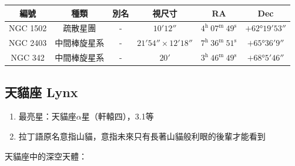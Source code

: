 \begin{center}
\begin{longtable}{c | c | c | c | c | c}
    編號 & 種類 & 別名 & 視尺寸 & RA & Dec \\
    \hline
    \endfirsthead


    \endfoot

    \endlastfoot

    NGC 1502 & 疏散星團 & - & \(\ang{;10;12}\) & \(4^\text{h }07^\text{m }49^\text{s}\) & \(+\ang{62;19;53}\) \\
    NGC 2403 & 中間棒旋星系 & - & \(\ang{;21;54}\times\ang{;12;18}\) & \(7^\text{h }36^\text{m }51^\text{s}\) & \(+\ang{65;36;9}\) \\
    NGC 342 & 中間棒旋星系 & - & \(\ang{;20;}\) & \(3^\text{h }46^\text{m }49^\text{s}\) & \(+\ang{68;5;46}\)
\end{longtable}
\end{center}

\subsection{天貓座 Lynx}
\begin{enumerate}
    \item 最亮星：天貓座\(\alpha\)星（軒轅四），3.1等
    \item 拉丁語原名意指山貓，意指未來只有長著山貓般利眼的後輩才能看到
\end{enumerate}
天貓座中的深空天體：

